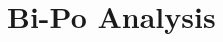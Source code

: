 \documentclass[phd,black]{PrincetonThesis}
\begin{document}
\chapter{Bi-Po Analysis}

%

\cleardoublepage

\end{document}
